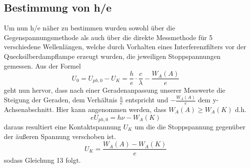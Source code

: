 \documentclass{scrartcl}
\begin{document}
	\subsection{Bestimmung von h/e}
		Um nun h/e näher zu bestimmen wurden sowohl über die Gegenspannungsmethode als auch über die direkte Messmethode
		für 5 verschiedene Wellenlängen, welche durch Vorhalten eines Interferenzfilters vor der Quecksilberdampflampe erzeugt wurden,
		die jeweiligen Stoppspannungen gemessen. Aus der Formel
		\begin{equation}
			U_0 = U_{ph,0} - U_K = \frac{h}{e}\cdot \frac{c}{\lambda} - \frac{W_A(A)}{e}
		\end{equation}
		geht nun hervor, dass nach einer Geradenanpassung unserer Messwerte die Steigung der Geraden, dem Verhältnis
		$\frac{h}{e}$ entspricht und $-\frac{W_A(A)}{e}$ dem y-Achsenabschnitt.
		Hier kann angenommen werden, dass $W_A(A)\geq W_A(K)$ d.h.
		\begin{equation}
			eU_{ph,0} = h\nu - W_A(K)
		\end{equation} 
		daraus resultiert eine Kontaktspannung $U_K$ um die die Stoppspannung gegenüber der äußeren Spannung verschoben ist.
		\begin{equation}
			U_K = \frac{W_A(A)-W_A(K)}{e}
		\end{equation}
		sodass Gleichung 13 folgt.
\end{document}

